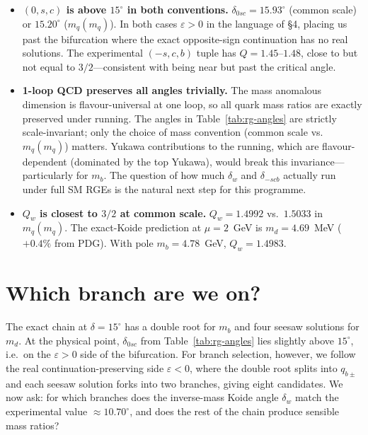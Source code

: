 \documentclass[11pt]{article}
\begin{document}
\begin{itemize}
  \item \textbf{$(0,s,c)$ is above $15^\circ$ in both conventions.}
    $\delta_{0sc} = 15.93^\circ$ (common scale) or $15.20^\circ$
    ($m_q(m_q)$).  In both cases $\varepsilon > 0$ in the language
    of \S4, placing us past the bifurcation where the exact
    opposite-sign continuation has no real solutions.
    The experimental $(-s,c,b)$ tuple has $Q = 1.45$--$1.48$,
    close to but not equal to $3/2$---consistent with being
    near but past the critical angle.

  \item \textbf{1-loop QCD preserves all angles trivially.}
    The mass anomalous dimension is flavour-universal at one loop,
    so all quark mass ratios are exactly preserved under running.
    The angles in Table~\ref{tab:rg-angles} are strictly scale-invariant; only
    the choice of mass convention (common scale vs.\ $m_q(m_q)$)
    matters.  Yukawa contributions to the running, which are
    flavour-dependent (dominated by the top Yukawa), would break
    this invariance---particularly for $m_b$.  The question of how
    much $\delta_w$ and $\delta_{-scb}$ actually run under full
    SM RGEs is the natural next step for this programme.

  \item \textbf{$Q_w$ is closest to $3/2$ at common scale.}
    $Q_w = 1.4992$ vs.\ $1.5033$ in $m_q(m_q)$.
    The exact-Koide prediction at $\mu=2$~GeV
    is $m_d = 4.69$~MeV ($+0.4\%$ from PDG).
    With pole $m_b = 4.78$~GeV, $Q_w = 1.4983$.
\end{itemize}

\section{Which branch are we on?}

The exact chain at $\delta = 15^\circ$ has a double root for $m_b$
and four seesaw solutions for $m_d$.  At the physical point,
$\delta_{0sc}$ from Table~\ref{tab:rg-angles} lies slightly above
$15^\circ$, i.e.\ on the $\varepsilon>0$ side of the bifurcation.  For branch
selection, however, we follow the real continuation-preserving side
$\varepsilon < 0$, where the double root splits into $q_{b\pm}$ and
each seesaw solution forks into two branches, giving eight candidates.
We now ask: for which branches does the inverse-mass Koide angle
$\delta_w$ match the experimental value $\approx 10.70^\circ$,
and does the rest of the chain produce sensible mass ratios?
\end{document}
